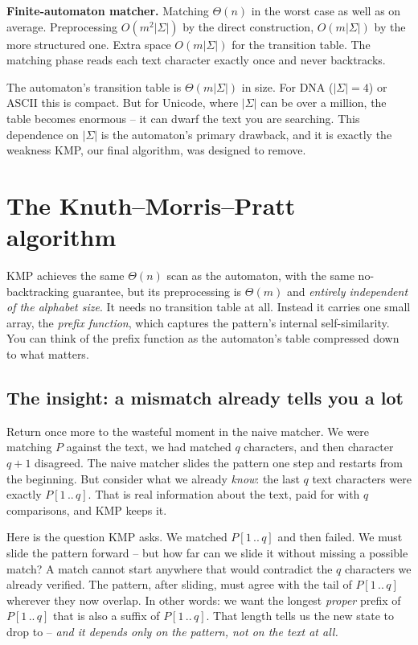 \begin{complexitybox}
\textbf{Finite-automaton matcher.} Matching $\Theta(n)$ in the worst case as
well as on average. Preprocessing $O(m^2|\Sigma|)$ by the direct
construction, $O(m|\Sigma|)$ by the more structured one. Extra space $O(m|\Sigma|)$ for
the transition table. The matching phase reads each text character exactly once
and never backtracks.
\end{complexitybox}

\begin{trapbox}
The automaton's transition table is $\Theta(m|\Sigma|)$ in size. For DNA
($|\Sigma|=4$) or ASCII this is compact. But for Unicode, where $|\Sigma|$ can
be over a million, the table becomes enormous -- it can dwarf the text you are
searching. This dependence on $|\Sigma|$ is the automaton's primary drawback, and it
is exactly the weakness KMP, our final algorithm, was designed to remove.
\end{trapbox}

\section{The Knuth--Morris--Pratt algorithm}
\label{ch31:kmp}

KMP achieves the same $\Theta(n)$ scan as the automaton, with the same
no-backtracking guarantee, but its preprocessing is $\Theta(m)$ and
\emph{entirely independent of the alphabet size}. It needs no transition table at all.
Instead it carries one small array, the \emph{prefix function}, which captures
the pattern's internal self-similarity. You can think of the prefix function as
the automaton's table compressed down to what matters.

\subsection{The insight: a mismatch already tells you a lot}

Return once more to the wasteful moment in the naive matcher. We were matching
$P$ against the text, we had matched $q$ characters, and then character $q+1$
disagreed. The naive matcher slides the pattern one step and restarts from the
beginning. But consider what we already \emph{know}: the last $q$ text characters
were exactly $P[1\,..\,q]$. That is real information about the text, paid for with
$q$ comparisons, and KMP keeps it.

Here is the question KMP asks. We matched $P[1\,..\,q]$ and then failed. We must
slide the pattern forward -- but how far can we slide it without missing a
possible match? A match cannot start anywhere that would contradict the $q$
characters we already verified. The pattern, after sliding, must agree with the
tail of $P[1\,..\,q]$ wherever they now overlap. In other words: we want the
longest \emph{proper} prefix of $P[1\,..\,q]$ that is also a suffix of
$P[1\,..\,q]$. That length tells us the new state to drop to -- \emph{and it
depends only on the pattern, not on the text at all.}

